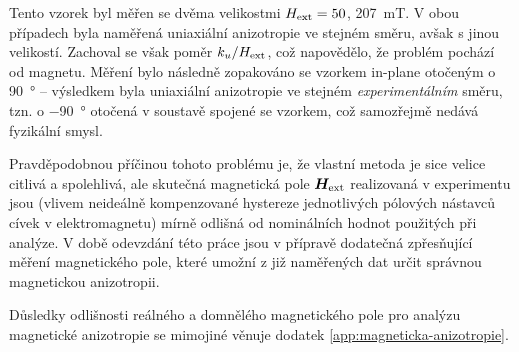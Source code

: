 Tento vzorek byl měřen se dvěma velikostmi $H_\textrm{ext} = 50$, \SI{207}{\milli\tesla}.
V obou případech byla naměřená uniaxiální anizotropie ve stejném směru, avšak s jinou velikostí.
Zachoval se však poměr $k_u/H_\textrm{ext}$, což napovědělo, že problém pochází od magnetu.
Měření bylo následně zopakováno se vzorkem in-plane otočeným o \SI{90}{\degree} -- výsledkem byla uniaxiální anizotropie ve stejném \emph{experimentálním} směru, tzn. o \SI{-90}{\degree} otočená v soustavě spojené se vzorkem, což samozřejmě nedává fyzikální smysl.

Pravděpodobnou příčinou tohoto problému je, že vlastní metoda je sice velice citlivá a spolehlivá, ale skutečná magnetická pole $\bm{H}_\textrm{ext}$ realizovaná v experimentu jsou (vlivem neideálně kompenzované hystereze jednotlivých pólových nástavců cívek v elektromagnetu) mírně odlišná od nominálních hodnot použitých při analýze.
V době odevzdání této práce jsou v přípravě dodatečná zpřesňující měření magnetického pole, které umožní z již naměřených dat určit správnou magnetickou anizotropii.

Důsledky odlišnosti reálného a domnělého magnetického pole pro analýzu magnetické anizotropie se mimojiné věnuje dodatek \ref{app:magneticka-anizotropie}.
